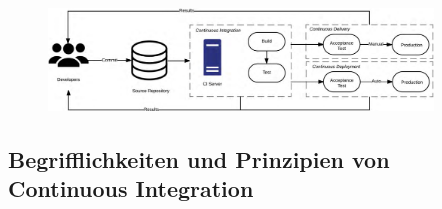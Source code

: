 \begin{figure}[H]
    \centering
    \includegraphics[width=0.91\textwidth]{images/content/ci-cde-cd}
    \label{fig:ci-cde-cd}
\end{figure}

\subsection{Begrifflichkeiten und Prinzipien von Continuous Integration} \label{subsec:02-background-2}


